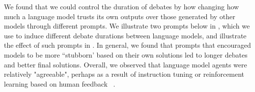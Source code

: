 We found that we could control the duration of debates by how changing how much a language model trusts its own outputs over those generated by other models through different prompts. We illustrate two prompts below in , which we use to induce different debate durations between language models, and illustrate the effect of such prompts in . In general, we found that prompts that encouraged models to be more ``stubborn’ based on their own solutions led to longer debates and better final solutions. Overall, we observed that language model agents were relatively "agreeable", perhaps as a result of instruction tuning or reinforcement learning based on human feedback ~\cite{ouyang2022training}.


